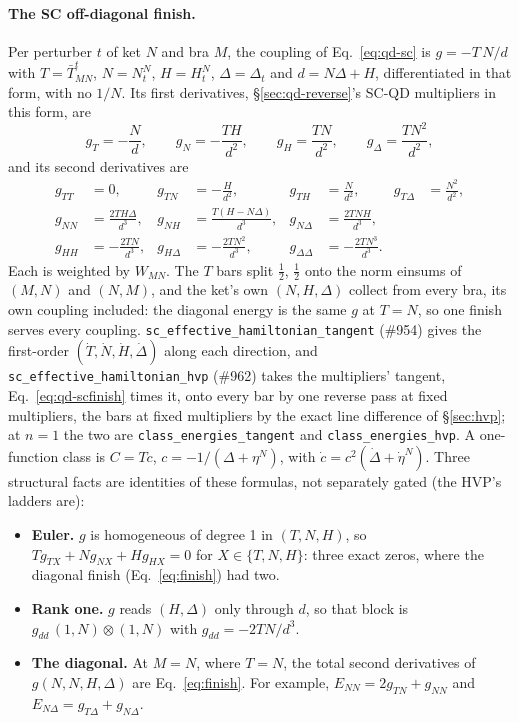 \documentclass[11pt]{article}
\newcommand{\code}[1]{\texttt{#1}}
\begin{document}
\paragraph{The SC off-diagonal finish.} Per perturber $t$ of ket $N$ and
bra $M$, the coupling of Eq.~\eqref{eq:qd-sc} is $g = -T\,N/d$ with $T =
\bar T^t_{MN}$, $N = N^N_t$, $H = H^N_t$, $\Delta = \Delta_t$ and $d =
N\Delta + H$, differentiated in that form, with no $1/N$. Its first
derivatives, \S\ref{sec:qd-reverse}'s SC-QD multipliers in this form, are
\[
  g_T = -\frac Nd,\qquad g_N = -\frac{TH}{d^2},\qquad
  g_H = \frac{TN}{d^2},\qquad g_\Delta = \frac{TN^2}{d^2},
\]
and its second derivatives are
\begin{equation}
\begin{aligned}
  g_{TT} &= 0, & g_{TN} &= -\frac{H}{d^2}, & g_{TH} &= \frac{N}{d^2}, & g_{T\Delta} &= \frac{N^2}{d^2},\\
  g_{NN} &= \frac{2TH\Delta}{d^3}, & g_{NH} &= \frac{T(H - N\Delta)}{d^3}, & g_{N\Delta} &= \frac{2TNH}{d^3}, \\
  g_{HH} &= -\frac{2TN}{d^3}, & g_{H\Delta} &= -\frac{2TN^2}{d^3}, & g_{\Delta\Delta} &= -\frac{2TN^3}{d^3}.
\end{aligned}
\label{eq:qd-scfinish}
\end{equation}
Each is weighted by $W_{MN}$. The $T$ bars split $\tfrac12$, $\tfrac12$
onto the norm einsums of $(M,N)$ and $(N,M)$, and the ket's own $(N, H,
\Delta)$ collect from every bra, its own coupling included: the diagonal
energy is the same $g$ at $T = N$, so one finish serves every coupling.
\code{sc\_effective\_hamiltonian\_tangent} (\#954) gives the
first-order $(\dot T, \dot N, \dot H, \dot\Delta)$ along each direction,
and \code{sc\_effective\_hamiltonian\_hvp} (\#962) takes the
multipliers' tangent, Eq.~\eqref{eq:qd-scfinish} times it, onto every bar by
one reverse pass at fixed multipliers, the bars at fixed multipliers by the
exact line difference of \S\ref{sec:hvp}; at $n = 1$ the two are
\code{class\_energies\_tangent} and \code{class\_energies\_hvp}. A
one-function class is $C = Tc$, $c = -1/(\Delta + \eta^N)$, with
$\dot c = c^2(\dot\Delta + \dot\eta^N)$. Three structural facts are
identities of these formulas, not separately gated (the HVP's ladders are):
\begin{itemize}
\item \textbf{Euler.} $g$ is homogeneous of degree 1 in $(T, N, H)$, so
  $Tg_{TX} + Ng_{NX} + Hg_{HX} = 0$ for $X \in \{T, N, H\}$: three exact
  zeros, where the diagonal finish (Eq.~\eqref{eq:finish}) had two.
\item \textbf{Rank one.} $g$ reads $(H, \Delta)$ only through $d$, so that
  block is $g_{dd}\,(1, N)\otimes(1, N)$ with $g_{dd} = -2TN/d^3$.
\item \textbf{The diagonal.} At $M = N$, where $T = N$, the total second
  derivatives of $g(N, N, H, \Delta)$ are Eq.~\eqref{eq:finish}. For
  example, $E_{NN} = 2g_{TN} + g_{NN}$ and $E_{N\Delta} = g_{T\Delta} +
  g_{N\Delta}$.
\end{itemize}
\end{document}
